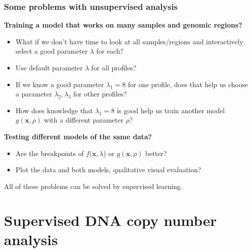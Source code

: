 \documentclass{beamer}
\begin{document}
\begin{frame}
  \frametitle{Some problems with unsupervised analysis}
  \textbf{Training a model that works on many samples and genomic
    regions?} 
  \begin{itemize}
  \item What if we don't have time to look at all samples/regions and
      interactively select a good parameter $\lambda$ for each?
  \item Use default parameter $\lambda$ for all profiles?
  \item If we know a good parameter $\lambda_1=8$ for one profile, 
    does that help us choose a parameter $\lambda_2, \lambda_3$ for
    other profiles?
  \item How does knowledge that $\lambda_1=8$ is good help us train
    another model $g(\mathbf x, \rho)$ with a different parameter
    $\rho$?
  \end{itemize}
  \textbf{Testing different models of the same data?} 
    \begin{itemize}
    \item   Are the breakpoints of $f(\mathbf x, \lambda$) or
  $g(\mathbf x, \rho)$ better?
    \item Plot the data and both models, qualitative visual evaluation?
    \end{itemize}
  All of these problems can be solved by supervised learning.
\end{frame}

\section{Supervised DNA copy number analysis}
\end{document}
